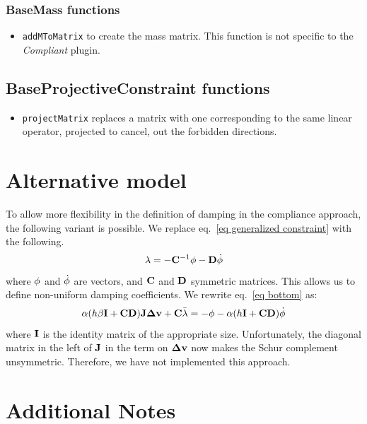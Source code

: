 \subsubsection{BaseMass functions}
\begin{itemize}
 \item \texttt{addMToMatrix} to create the mass matrix. This function is not specific to the \textit{Compliant} plugin.
\end{itemize}

\subsection{BaseProjectiveConstraint functions}
\begin{itemize}
 \item \texttt{projectMatrix} replaces a matrix with one corresponding to the same linear operator, projected to cancel, out the forbidden directions. 
\end{itemize}


\section{Alternative model} \label{sec alternative model}
To allow more flexibility in the definition of damping in the compliance approach, the following variant is possible.
We replace eq.~\ref{eq generalized constraint} with the following.
\begin{equation}\label{eq generalized damped constraint}
\mathbf{\lambda} = - \mathbf{C}^{-1} \phi - \mathbf{D} \dot {\phi}
\end{equation}
where $\phi$ and $\dot {\phi}$ are vectors, and $\mathbf{C}$ and $\mathbf{D}$ symmetric matrices.
This allows us to define non-uniform damping coefficients.
We rewrite eq.~\ref{eq bottom} as:
\begin{equation}
 \label{eq bottom alt}
 \alpha( h \beta \mathbf{I} + \mathbf{C} \mathbf{D}) \mathbf{J} \mathbf{\Delta v} + \mathbf{C} \bar{\mathbf{\lambda}} = -\phi - \alpha(h\mathbf{I} + \mathbf{C}\mathbf{D} )\dot {\phi}
\end{equation}
where $\mathbf{I}$ is the identity matrix of the appropriate size.
Unfortunately, the diagonal matrix in the left of $\mathbf{J}$ in the term on $\mathbf{\Delta v}$ now makes the Schur complement unsymmetric. Therefore, we have not implemented this approach.



\section{Additional Notes}
\label{sec:additional notes}

